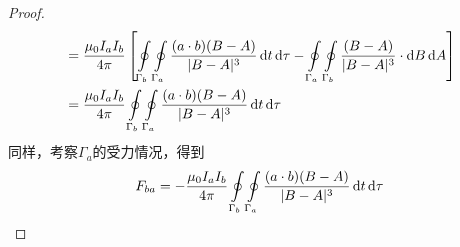 \documentclass{mynote}
\begin{document}
\begin{proof}
\begin{align*}
    &=  \frac{\mu_0 I_a I_b}{4\pi} \left[ \oint\limits_{\Gamma _b} \oint\limits_{\Gamma_a} \frac{(a \cdot b)(B-A)}{\vert B - A \vert ^3}  \mathop{}\!\mathrm{d} t \mathop{}\!\mathrm{d} \tau - \oint\limits_{\Gamma _a} \oint\limits_{\Gamma_b}  \frac{(B-A)}{\vert B - A \vert ^3}\cdot \mathop{}\!\mathrm{d} B \mathop{}\!\mathrm{d} A\right] \\
    &=  \frac{\mu_0 I_a I_b}{4\pi}\oint\limits_{\Gamma _b} \oint\limits_{\Gamma_a} \frac{(a \cdot b)(B-A)}{\vert B - A \vert ^3}  \mathop{}\!\mathrm{d} t \mathop{}\!\mathrm{d} \tau
    \end{align*}
    同样，考察$\Gamma_a$的受力情况，得到
    \[
        F_{ba} = -\frac{\mu_0 I_a I_b}{4\pi}\oint\limits_{\Gamma _b} \oint\limits_{\Gamma_a} \frac{(a \cdot b)(B-A)}{\vert B - A \vert ^3}  \mathop{}\!\mathrm{d} t \mathop{}\!\mathrm{d} \tau
    \]
\end{proof}
\end{document}
